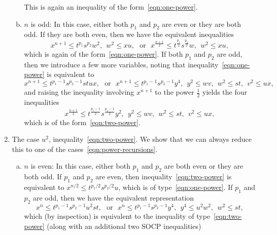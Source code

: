 \documentclass[11pt]{article}
\newcommand{\half}{\frac{1}{2}}
\begin{document}
\begin{enumerate}[(1)]
\begin{enumerate}[a.]
\begin{equation*}
    \end{equation*}
    This is again an inequality of the form~\eqref{eqn:one-power}.
  \item $n$ is odd: In this case, either both $p_1$ and $p_2$ are even
    or they are both odd. If they are both even, then we have the equivalent
    inequalities
    \begin{equation*}
      x^{n + 1} \le t^{p_1} s^{p_2} w^2, ~~ w^2 \le xu,
      ~~~ \mbox{or} ~~~
      x^{\frac{n + 1}{2}} \le t^{\frac{p_1}{2}} s^{\frac{p_2}{2}} w,
      ~~ w^2 \le xu,
    \end{equation*}
    which is again of the form~\eqref{eqn:one-power}. If both $p_1$ and $p_2$
    are odd, then we introduce a few more variables,
    noting that inequality~\eqref{eqn:one-power} is equivalent to
    \begin{equation*}
      x^{n + 1} \le t^{p_1 - 1} s^{p_2 - 1} st ux,
      ~~~ \mbox{or} ~~~
      x^{n + 1} \le t^{p_1 - 1} s^{p_2 - 1} y^4,
      ~~ y^2 \le w v, ~~ w^2 \le st, ~~ v^2 \le ux,
    \end{equation*}
    and raising the inequality involving $x^{n + 1}$ to the power $\half$
    yields the four inequalities
    \begin{equation*}
      x^{\frac{n + 1}{2}} \le t^{\frac{p_1 - 1}{2}} s^{\frac{p_2 - 1}{2}} y^2,
      ~~ y^2 \le w v, ~~ w^2 \le st, ~~ v^2 \le ux,
    \end{equation*}
    which is of the form~\eqref{eqn:two-power}.
  \end{enumerate}
\item The case $u^2$, inequality~\eqref{eqn:two-power}. We show that
  we can always reduce this to one of the cases~\eqref{eqn:power-recursions}.
  \begin{enumerate}[a.]
  \item $n$ is even: In this case, either both $p_1$ and $p_2$ are both even
    or they are both odd. If $p_1$ and $p_2$ are even, then
    inequality~\eqref{eqn:two-power} is equivalent to $x^{n/2} \le
    t^{p_1/2} s^{p_2/2} u$, which is of type~\eqref{eqn:one-power}.
    If $p_1$ and $p_2$ are odd, then we have the equivalent representation
    \begin{equation*}
      x^n \le t^{p_1 - 1} s^{p_2 - 1} u^2 st, ~~~ \mbox{or} ~~~
      x^n \le t^{p_1 - 1} s^{p_2 - 1} y^4, ~~ y^4 \le u^2 w^2,
      ~~ w^2 \le st,
    \end{equation*}
    which (by inspection) is equivalent to the inequality of
    type~\eqref{eqn:two-power} (along with an additional two SOCP inequalities)

\end{enumerate}
\end{enumerate}
\end{document}
